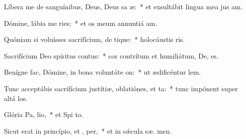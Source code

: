 \item Líbera me de sanguínibus, Deus, Deus sa æ:~* et exsultábit lingua mea jus am.
\item Dómine, lábia me ries:~* et os meum annuntiá  am.
\item Quóniam si voluísses sacrifícium, de tique:~* holocáustis  ris.
\item Sacrifícium Deo spíritus contus:~* cor contrítum et humiliátum, De,  es.
\item Benígne fac, Dómine, in bona voluntáte  on:~* ut ædificéntur  lem.
\item Tunc acceptábis sacrifícium justítiæ, oblatiónes, et ta:~* tunc impónent super altá  los.
\item Glória Pa,  lio,~* et Spi to.
\item Sicut erat in princípio, et ,  per,~* et in sǽcula sæ. men.
